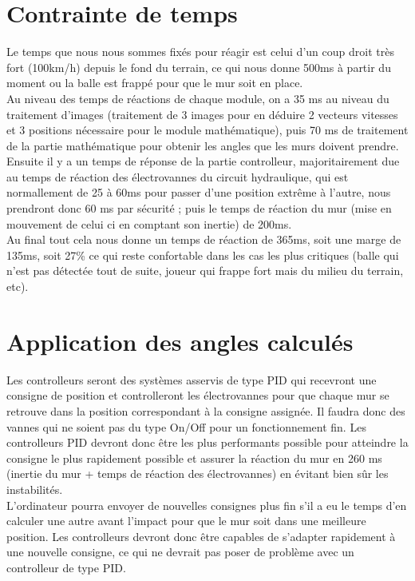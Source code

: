 \section{Contrainte de temps}

Le temps que nous nous sommes fixés pour réagir est celui d'un coup droit très fort (100km/h) depuis le fond du terrain, ce qui nous donne 500ms à partir du moment ou la balle est frappé pour que le mur soit en place. \\
Au niveau des temps de réactions de chaque module, on a 35 ms au niveau du traitement d'images (traitement de 3 images pour en déduire 2 vecteurs vitesses et 3 positions nécessaire pour le module mathématique), puis 70 ms de traitement de la partie mathématique pour obtenir les angles que les murs doivent prendre. Ensuite il y a un temps de réponse de la partie controlleur, majoritairement due au temps de réaction des électrovannes du circuit hydraulique, qui est normallement de 25 à 60ms pour passer d'une position extrême à l'autre, nous prendront donc 60 ms par sécurité ; puis le temps de réaction du mur (mise en mouvement de celui ci en comptant son inertie) de 200ms.\\
Au final tout cela nous donne un temps de réaction de 365ms, soit une marge de 135ms, soit 27\% ce qui reste confortable dans les cas les plus critiques (balle qui n'est pas détectée tout de suite, joueur qui frappe fort mais du milieu du terrain, etc).

\section{Application des angles calculés}

Les controlleurs seront des systèmes asservis de type PID qui recevront une consigne de position et controlleront les électrovannes pour que chaque mur se retrouve dans la position correspondant à la consigne assignée. Il faudra donc des vannes qui ne soient pas du type On/Off pour un fonctionnement fin. Les controlleurs PID devront donc être les plus performants possible pour atteindre la consigne le plus rapidement possible et assurer la réaction du mur en 260 ms (inertie du mur + temps de réaction des électrovannes) en évitant bien sûr les instabilités.\\
L'ordinateur pourra envoyer de nouvelles consignes plus fin s'il a eu le temps d'en calculer une autre avant l'impact pour que le mur soit dans une meilleure position. Les controlleurs devront donc être capables de s'adapter rapidement à une nouvelle consigne, ce qui ne devrait pas poser de problème avec un controlleur de type PID.

